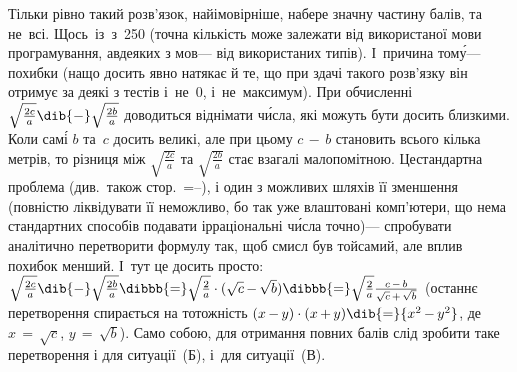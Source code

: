 Тільки рівно такий розв'язок, найімовірніше, набере значну частину балів, та не~всі. Щось~із~з~250 (точна кількість може залежати від використаної мови програмування, а\nolinebreak[2] в\nolinebreak[2] деяких з мов\nolinebreak[3] --- від використаних типів). І~причина том\'{у}\nolinebreak[3] --- похибки (на\nolinebreak[3] що досить явно натякає й те, що при здачі такого розв'язку він отримує за деякі з тестів і~не~0, і~не~максимум). При обчисленні $\sqrt{\frac{2c}{a}}\dib{{-}}\sqrt{\frac{2b}{a}}$ доводиться віднімати ч\'{и}сла, які можуть бути досить близкими. Коли сам\'{і} $b$ та~$c$ досить великі, але при цьому ${c\,{-}\,b}$ становить всього кілька метрів, то різниця між $\sqrt{\frac{2c}{a}}$ та $\sqrt{\frac{2b}{a}}$ стає взагалі малопомітною. Це\nolinebreak[3] стандартна проблема (див.~також стор.~\pageref{sec:floating-point}\ifnum{}=\else--\pageref{text:floating-point-end}\fi), і один з можливих шляхів її зменшення (повністю ліквідувати її неможливо, бо так уже влаштовані комп'ютери, що нема стандартних способів подавати ірраціональні ч\'{и}сла точно)\nolinebreak[3] --- спробувати аналітично перетворити формулу так, щоб смисл був той\nolinebreak[3] самий, але вплив похибок менший. І~тут це досить просто: $
\sqrt{\frac{2c}{a}}\dib{{-}}\sqrt{\frac{2b}{a}}
\dibbb{{=}}
\sqrt{\frac{2}{a}}\cdot{(\sqrt{c}\,{-}\,\sqrt{b})}
\dibbb{{=}}
\sqrt{\frac{2}{a}}\frac{c\,-\,b}{\sqrt{c}\,{+}\,\sqrt{b}}
$
(останнє перетворення спирається на тотожність $(x\,{-}\,y)\cdot(x\,{+}\,y)\dib{{=}}{x^2\,{-}\,y^2}$, де ${x\,{=}\,\sqrt{c}}$, ${y\,{=}\,\sqrt{b}}$). Само собою, для отримання повних балів слід зробити таке  перетворення і для ситуації~(Б), і~для ситуації~(В).